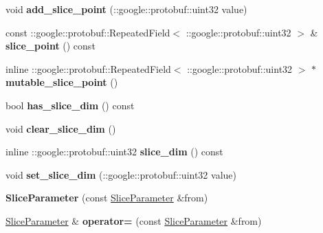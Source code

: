\begin{DoxyCompactItemize}
void {\bfseries add\+\_\+slice\+\_\+point} (\+::google\+::protobuf\+::uint32 value)
\item 
\mbox{\label{classcaffe_1_1_slice_parameter_af3e14b3ea3793c043ccf810d1f2e0c70}} 
const \+::google\+::protobuf\+::\+Repeated\+Field$<$ \+::google\+::protobuf\+::uint32 $>$ \& {\bfseries slice\+\_\+point} () const
\item 
\mbox{\label{classcaffe_1_1_slice_parameter_a9cc0b066c1c454dd4d866b7b70676f46}} 
inline \+::google\+::protobuf\+::\+Repeated\+Field$<$ \+::google\+::protobuf\+::uint32 $>$ $\ast$ {\bfseries mutable\+\_\+slice\+\_\+point} ()
\item 
\mbox{\label{classcaffe_1_1_slice_parameter_a8b252220b368542a1518ed44b9c81eef}} 
bool {\bfseries has\+\_\+slice\+\_\+dim} () const
\item 
\mbox{\label{classcaffe_1_1_slice_parameter_a8d83e0a651a4b7cfca41b3abd7e2de11}} 
void {\bfseries clear\+\_\+slice\+\_\+dim} ()
\item 
\mbox{\label{classcaffe_1_1_slice_parameter_a5221ce6d52840cdd07804b6683eb4872}} 
inline \+::google\+::protobuf\+::uint32 {\bfseries slice\+\_\+dim} () const
\item 
\mbox{\label{classcaffe_1_1_slice_parameter_a0b4afa8bd902e2937634d390cf25e981}} 
void {\bfseries set\+\_\+slice\+\_\+dim} (\+::google\+::protobuf\+::uint32 value)
\item 
\mbox{\label{classcaffe_1_1_slice_parameter_a567e673d546c727c37107b36290d49a4}} 
{\bfseries Slice\+Parameter} (const \mbox{\hyperlink{classcaffe_1_1_slice_parameter}{Slice\+Parameter}} \&from)
\item 
\mbox{\label{classcaffe_1_1_slice_parameter_abde536a5f111ced6fb8b8942566edb57}} 
\mbox{\hyperlink{classcaffe_1_1_slice_parameter}{Slice\+Parameter}} \& {\bfseries operator=} (const \mbox{\hyperlink{classcaffe_1_1_slice_parameter}{Slice\+Parameter}} \&from)
\item 
\mbox{\label{classcaffe_1_1_slice_parameter_a13c3245acd1230a29b83fdea6602983a}} 

\end{DoxyCompactItemize}
